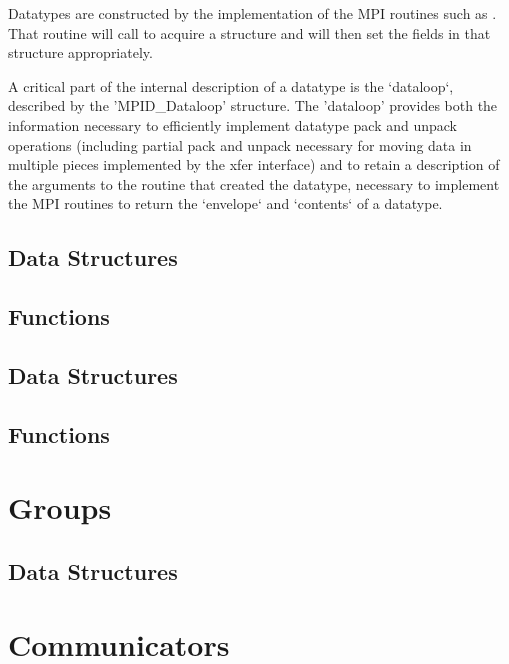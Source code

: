 \documentclass[dvipdfm]{article}
\begin{document}
Datatypes are constructed by the implementation of the MPI routines such as 
.  That routine will call
 to acquire a structure and will then set the fields
in that structure appropriately. 

A critical part of the internal description of a datatype is the
`dataloop`, described by the 'MPID_Dataloop' structure.  
The 'dataloop' provides both the information necessary to
efficiently implement datatype pack and unpack operations (including
partial pack and unpack necessary for moving data in multiple pieces
implemented by the xfer interface)
and to retain a description of the arguments to the routine that
created the datatype, necessary to implement the MPI routines to
return the `envelope` and `contents` of a datatype.

\subsection{Data Structures}

\subsection{Functions}




\subsection{Data Structures}

\subsection{Functions}


\section{Groups}

\subsection{Data Structures}

%

\section{Communicators}
\end{document}
